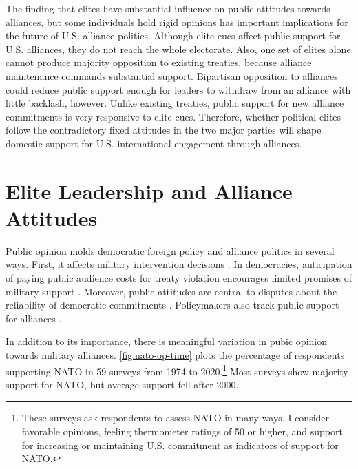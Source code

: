 \documentclass[12pt]{article}
\begin{document}
The finding that elites have substantial influence on public attitudes towards alliances, but some individuals hold rigid opinions has important implications for the future of U.S. alliance politics. 
Although elite cues affect public support for U.S. alliances, they do not reach the whole electorate.
Also, one set of elites alone cannot produce majority opposition to existing treaties, because alliance maintenance commands substantial support.
Bipartisan opposition to alliances could reduce public support enough for leaders to withdraw from an alliance with little backlash, however.  
Unlike existing treaties, public support for new alliance commitments is very responsive to elite cues. 
Therefore, whether political elites follow the contradictory fixed attitudes in the two major parties will shape domestic support for U.S. international engagement through alliances.



\section{Elite Leadership and Alliance Attitudes}


Public opinion molds democratic foreign policy and alliance politics in several ways.
First, it affects military intervention decisions \citep{Tomzetal2020, LinGreenberg2021}. 
In democracies, anticipation of paying public audience costs for treaty violation encourages limited promises of military support \citep{Chibaetal2015, FjelstulReiter2019}. 
Moreover, public attitudes are central to disputes about the reliability of democratic commitments \citep{Gaubatz1996, GartzkeGleditsch2004}. 
Policymakers also track public support for alliances \citep{Sayle2019}. 


In addition to its importance, there is meaningful variation in pubic opinion towards military alliances. 
\autoref{fig:nato-op-time} plots the percentage of respondents supporting NATO in 59 surveys from 1974 to 2020.\footnote{These surveys ask respondents to assess NATO in many ways. I consider favorable opinions, feeling thermometer ratings of 50 or higher, and support for increasing or maintaining U.S. commitment as indicators of support for NATO.} 
Most surveys show majority support for NATO, but average support fell after 2000.  
\end{document}
